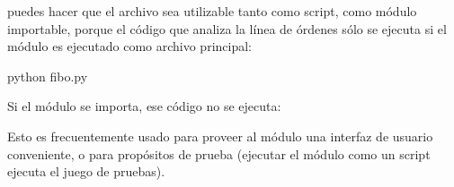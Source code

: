\documentclass[a4,10pt,spanish]{sphinxmanual}
\begin{document}
\sphinxAtStartPar
puedes hacer que el archivo sea utilizable tanto como script, como módulo importable, porque el código que analiza la línea de órdenes sólo se ejecuta si el módulo es ejecutado como archivo principal:

\begin{sphinxVerbatim}[commandchars=\\\{\}]
 python fibo.py 
\end{sphinxVerbatim}

\sphinxAtStartPar
Si el módulo se importa, ese código no se ejecuta:

\begin{sphinxVerbatim}[commandchars=\\\{\}]
 
\end{sphinxVerbatim}

\sphinxAtStartPar
Esto es frecuentemente usado para proveer al módulo una interfaz de usuario conveniente, o para propósitos de prueba (ejecutar el módulo como un script ejecuta el juego de pruebas).
\end{document}
